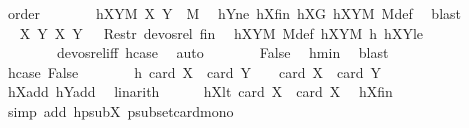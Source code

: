 \begin{isabellebody}
\ order\isanewline
\ \ \ \ \isamarkupfalse%
\ \isamarkupfalse%
\ hXY{}M{\isacharcolon}{\kern0pt}\ {\isachardoublequoteopen}{\isacharparenleft}{\kern0pt}{\isacharquery}{\kern0pt}X{}{\isacharcomma}{\kern0pt}\ {\isacharquery}{\kern0pt}Y{}{\isacharparenright}{\kern0pt}\ {\isasymin}\ M{\isachardoublequoteclose}\ \isamarkupfalse%
\ hY{}ne\ hX{}fin\ hX{}G\ hXYM\ M{\isacharunderscore}{\kern0pt}def\ \isamarkupfalse%
\ blast\isanewline
\ \ \ \ \isamarkupfalse%
\ \isamarkupfalse%
\ {\isachardoublequoteopen}{\isacharparenleft}{\kern0pt}{\isacharparenleft}{\kern0pt}{\isacharquery}{\kern0pt}X{}{\isacharcomma}{\kern0pt}\ {\isacharquery}{\kern0pt}Y{}{\isacharparenright}{\kern0pt}{\isacharcomma}{\kern0pt}\ {\isacharparenleft}{\kern0pt}X{\isacharcomma}{\kern0pt}\ Y{\isacharparenright}{\kern0pt}{\isacharparenright}{\kern0pt}\ {\isasymin}\ \ Restr\ devos{\isacharunderscore}{\kern0pt}rel\ {\isacharquery}{\kern0pt}fin{\isachardoublequoteclose}\ \isamarkupfalse%
\ hXYM\ M{\isacharunderscore}{\kern0pt}def\ hXY{}M\ h\ hXY{}le\ \isanewline
\ \ \ \ \ \ \ \ devos{\isacharunderscore}{\kern0pt}rel{\isacharunderscore}{\kern0pt}iff\ hcase\ \isamarkupfalse%
\ auto\isanewline
\ \ \ \ \isamarkupfalse%
\ \isamarkupfalse%
\ False\ \isamarkupfalse%
\ hmin\ \isamarkupfalse%
\ blast\ \isanewline
\ \ \isamarkupfalse%
\isanewline
\ \ \ \ \isamarkupfalse%
\ hcase{\isacharcolon}{\kern0pt}\ False\isanewline
\ \ \ \ \isamarkupfalse%
\ \isamarkupfalse%
\ h{\isacharcolon}{\kern0pt}\ {\isachardoublequoteopen}card\ {\isacharquery}{\kern0pt}X{}\ {\isacharplus}{\kern0pt}\ card\ {\isacharquery}{\kern0pt}Y{}\ {\isacharminus}{\kern0pt}\ {}\ {\isasymge}\ card\ X\ {\isacharplus}{\kern0pt}\ card\ Y\ {\isacharminus}{\kern0pt}\ {}{\isachardoublequoteclose}\ \isamarkupfalse%
\ hXadd\ hYadd\ \isamarkupfalse%
\ linarith\isanewline
\ \ \ \ \isamarkupfalse%
\ hX{}lt{\isacharcolon}{\kern0pt}\ {\isachardoublequoteopen}card\ {\isacharquery}{\kern0pt}X{}\ {\isacharless}{\kern0pt}\ card\ X{\isachardoublequoteclose}\ \isamarkupfalse%
\ hXfin\ \isamarkupfalse%
\ {\isacharparenleft}{\kern0pt}simp\ add{\isacharcolon}{\kern0pt}\ hpsubX\ psubset{\isacharunderscore}{\kern0pt}card{\isacharunderscore}{\kern0pt}mono{\isacharparenright}{\kern0pt}\isanewline

\end{isabellebody}
